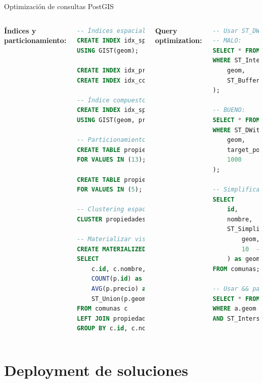 \documentclass[10pt,aspectratio=169]{beamer}
\begin{document}
\begin{frame}[fragile]{Optimización de consultas PostGIS}
    \begin{columns}[T]
        \textbf{Índices y particionamiento:}
        \begin{lstlisting}[language=SQL]
-- Índices espaciales y de atributos
CREATE INDEX idx_spatial ON propiedades 
USING GIST(geom);

CREATE INDEX idx_precio ON propiedades(precio);
CREATE INDEX idx_comuna ON propiedades(comuna_id);

-- Índice compuesto
CREATE INDEX idx_spatial_price ON propiedades 
USING GIST(geom, precio_range);

-- Particionamiento por región
CREATE TABLE propiedades_rm PARTITION OF propiedades
FOR VALUES IN (13);

CREATE TABLE propiedades_v PARTITION OF propiedades
FOR VALUES IN (5);

-- Clustering espacial para mejor performance
CLUSTER propiedades USING idx_spatial;

-- Materializar vistas complejas
CREATE MATERIALIZED VIEW mv_stats_comuna AS
SELECT 
    c.id, c.nombre,
    COUNT(p.id) as total_propiedades,
    AVG(p.precio) as precio_promedio,
    ST_Union(p.geom) as coverage
FROM comunas c
LEFT JOIN propiedades p ON ST_Contains(c.geom, p.geom)
GROUP BY c.id, c.nombre;
        \end{lstlisting}
        
        \textbf{Query optimization:}
        \begin{lstlisting}[language=SQL]
-- Usar ST_DWithin en vez de buffer
-- MALO:
SELECT * FROM points 
WHERE ST_Intersects(
    geom, 
    ST_Buffer(target_point, 1000)
);

-- BUENO:
SELECT * FROM points 
WHERE ST_DWithin(
    geom, 
    target_point, 
    1000
);

-- Simplificar para visualización
SELECT 
    id,
    nombre,
    ST_SimplifyPreserveTopology(
        geom, 
        10  -- tolerancia
    ) as geom_simple
FROM comunas;

-- Usar && para pre-filtrar
SELECT * FROM a, b
WHERE a.geom && b.geom  -- bbox check
AND ST_Intersects(a.geom, b.geom);
        \end{lstlisting}
    \end{columns}
\end{frame}

\section{Deployment de soluciones}
\end{document}
